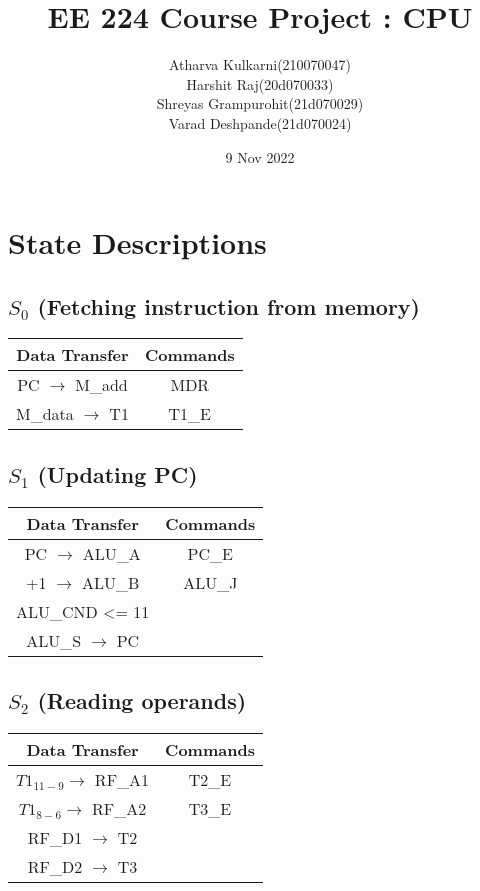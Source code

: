 \documentclass[]{article}
\title{EE 224 Course Project : CPU}
\author{Atharva Kulkarni(210070047) \\Harshit Raj(20d070033) \\
 Shreyas Grampurohit(21d070029) \\ Varad Deshpande(21d070024)}
\date{9 Nov 2022}
\begin{document}
\maketitle

    \section*{State Descriptions}
        \subsection*{$S_0$ (Fetching instruction from memory)}  %
            \begin{center}
                \begin{tabular}{|c|c|}
                    \hline
                    Data Transfer & Commands \\
                    \hline
                    PC $\to$ M\_add & MDR\\
                        M\_data $\to$ T1& T1\_E\\
                    \hline
                \end{tabular}
            \end{center}
        \subsection*{$S_1$ (Updating PC)}   %
        \begin{center}
            \begin{tabular}{|c|c|}
                \hline
                Data Transfer & Commands \\
                \hline
                PC $\to$ ALU\_A & PC\_E\\
                +1 $\to$ ALU\_B & ALU\_J\\
                ALU\_CND <= 11 & \\
                ALU\_S $\to$ PC &\\
                \hline
            \end{tabular}
        \end{center}
        \subsection*{$S_2$ (Reading operands)}
        \begin{center}
            \begin{tabular}{|c|c|}
                \hline
                Data Transfer & Commands \\
                \hline
                $T1_{11-9} \to$ RF\_A1  & T2\_E\\
                $T1_{8-6} \to$ RF\_A2 & T3\_E\\
                RF\_D1 $\to$ T2 & \\
                RF\_D2 $\to$ T3 & \\
                \hline
            \end{tabular}
        \end{center}
\end{document}
